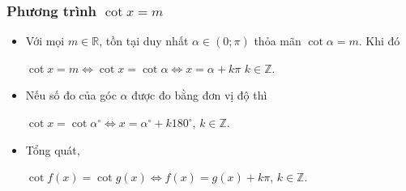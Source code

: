 \begin{tomtat}
\subsubsection{Phương trình $\cot x=m$}
\begin{itemize}
	\item Với mọi $m\in\mathbb{R}$, tồn tại duy nhất $\alpha\in\left(0;\pi\right)$ thỏa mãn $\cot\alpha=m$. Khi đó
	\begin{center}
		$\cot x=m\Leftrightarrow\cot x=\cot\alpha\Leftrightarrow x=\alpha+k\pi$ $k\in\mathbb{Z}$.
	\end{center}
\item Nếu số đo của góc $\alpha$ được đo bằng đơn vị độ thì
\begin{center}
	$\cot x=\cot\alpha^\circ\Leftrightarrow x=\alpha^\circ+k180^\circ$, $k\in\mathbb{Z}$.
\end{center}
\item Tổng quát,
\begin{center}
	$\cot f(x)=\cot g(x)\Leftrightarrow f(x)=g(x)+k\pi$, $k\in\mathbb{Z}$.
\end{center}
\end{itemize}
\end{tomtat}

